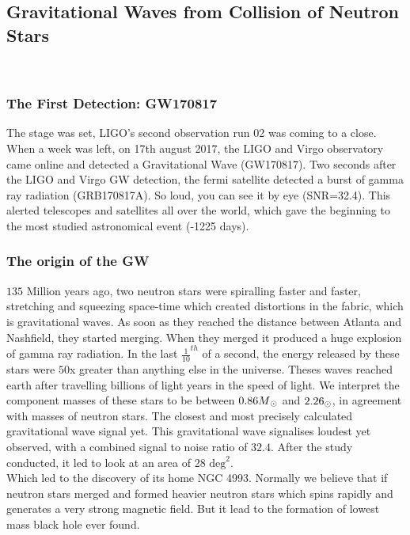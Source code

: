 \subsection{ Gravitational Waves from Collision of Neutron Stars }\\

\subsubsection{The First Detection: GW170817}
 
The stage was set, LIGO's second observation run {02} was coming to a close. When a week was left, on 17th august 2017, the LIGO and Virgo observatory came online and detected a Gravitational Wave (GW170817). Two seconds after the LIGO and Virgo GW detection, the fermi satellite detected a burst of gamma ray radiation (GRB170817A). So loud, you can see it by eye (SNR=32.4). This alerted telescopes and satellites all over the world, which gave the beginning to the most studied astronomical event (-1225 days).  
 
 \subsubsection{The origin of the GW}
 
 $135$ Million years ago, two neutron stars were spiralling faster and faster, stretching and squeezing space-time which created distortions in the fabric, which is gravitational waves. As soon as they reached the distance between Atlanta and Nashfield, they started merging. When they merged it produced a huge explosion of gamma ray radiation. In the last $\frac{1}{10}^{th}$ of a second, the energy released by these stars were $50$x greater than anything else in the universe. Theses waves reached earth after travelling billions of light years in the speed of light. We interpret the component masses of these stars to be between $0.86M\textsubscript{\(\odot\)}$ and  $2.26\textsubscript{\(\odot\)}$, in agreement with masses of neutron stars. The closest and most precisely calculated gravitational wave signal yet. This gravitational wave signalises loudest yet observed, with a combined signal to noise ratio of $32.4$. After the study conducted, it led to look at an area of 28 $\text{deg}^{2}$.\\
 Which led to the discovery of its home NGC 4993. Normally we believe that if neutron stars merged and formed heavier neutron stars which spins rapidly and generates a very strong magnetic field. But it lead to the formation of lowest mass black hole ever found. 
 
